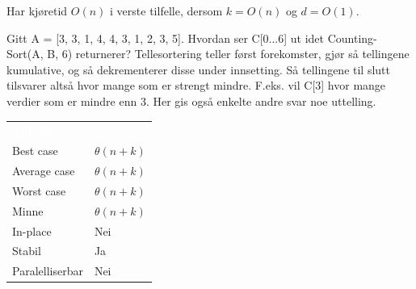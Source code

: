 \noindent Har kjøretid $O(n)$ i verste tilfelle, dersom $k = O(n)$ og $d = O(1)$.\\

\begin{boxed}
Gitt A = [3, 3, 1, 4, 4, 3, 1, 2, 3, 5]. Hvordan ser C[0...6] ut idet Counting-Sort(A, B, 6) returnerer?
\newline\newline
[0, 0, 2, 3, 7, 9, 10] \newline\newline  Tellesortering teller først forekomster, gjør så tellingene kumulative, og så dekrementerer disse under innsetting. Så tellingene til slutt tilsvarer altså hvor mange som er strengt mindre. F.eks. vil C[3] hvor mange verdier som er mindre enn 3. Her gis også enkelte andre svar noe uttelling.
\end{boxed}

\begin{table}[H]
    \label{tab:bubblesort}
    \centering
    \begin{tabular}{|L{15em} | L{15em}|}
        \hline
        \textbf{\textcolor{white}{Tilfelle}} & \textbf{\textcolor{white}{}}\\
        Best case & $\theta(n + k)$\\
        Average case & $\theta(n + k)$\\
        Worst case & $\theta(n + k)$\\
        Minne & $\theta(n + k)$\\
        In-place & Nei\\
        Stabil & Ja\\
        Paralelliserbar & Nei\\
         \hline
    \end{tabular}
\end{table}

